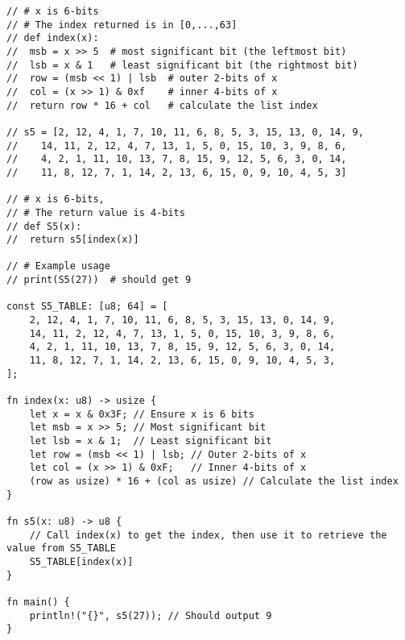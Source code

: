 \begin{lstlisting}[style=C]
// # x is 6-bits
// # The index returned is in [0,...,63]
// def index(x):
//	msb = x >> 5  # most significant bit (the leftmost bit)
//	lsb = x & 1   # least significant bit (the rightmost bit)
//	row = (msb << 1) | lsb  # outer 2-bits of x
//	col = (x >> 1) & 0xf    # inner 4-bits of x
//	return row * 16 + col   # calculate the list index

// s5 = [2, 12, 4, 1, 7, 10, 11, 6, 8, 5, 3, 15, 13, 0, 14, 9,
//	  14, 11, 2, 12, 4, 7, 13, 1, 5, 0, 15, 10, 3, 9, 8, 6,
//	  4, 2, 1, 11, 10, 13, 7, 8, 15, 9, 12, 5, 6, 3, 0, 14,
//	  11, 8, 12, 7, 1, 14, 2, 13, 6, 15, 0, 9, 10, 4, 5, 3]

// # x is 6-bits,
// # The return value is 4-bits
// def S5(x):
// 	return s5[index(x)]

// # Example usage
// print(S5(27))  # should get 9

const S5_TABLE: [u8; 64] = [
	2, 12, 4, 1, 7, 10, 11, 6, 8, 5, 3, 15, 13, 0, 14, 9,
	14, 11, 2, 12, 4, 7, 13, 1, 5, 0, 15, 10, 3, 9, 8, 6,
	4, 2, 1, 11, 10, 13, 7, 8, 15, 9, 12, 5, 6, 3, 0, 14,
	11, 8, 12, 7, 1, 14, 2, 13, 6, 15, 0, 9, 10, 4, 5, 3,
];

fn index(x: u8) -> usize {
	let x = x & 0x3F; // Ensure x is 6 bits
	let msb = x >> 5; // Most significant bit
	let lsb = x & 1;  // Least significant bit
	let row = (msb << 1) | lsb; // Outer 2-bits of x
	let col = (x >> 1) & 0xF;   // Inner 4-bits of x
	(row as usize) * 16 + (col as usize) // Calculate the list index
}

fn s5(x: u8) -> u8 {
	// Call index(x) to get the index, then use it to retrieve the value from S5_TABLE
	S5_TABLE[index(x)]
}

fn main() {
	println!("{}", s5(27)); // Should output 9
}
\end{lstlisting}





